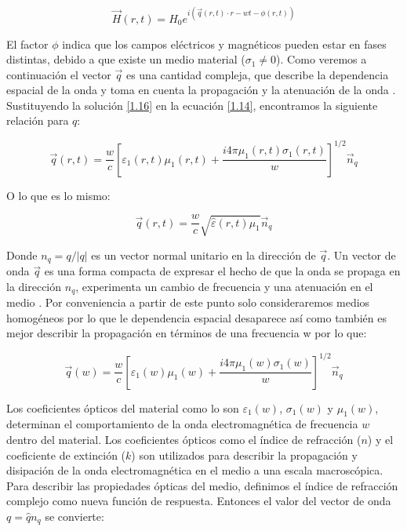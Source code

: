 \documentclass[a4paper,openright,12pt]{book}
\begin{document}
\begin{equation}\label{1.17}
   \vec{H}(r,t)=H_{0}e^{i(\vec{q}(r,t)\cdot r-wt-\phi(r,t))}
\end{equation}

El factor $\phi$ indica que los campos eléctricos y magnéticos pueden estar en fases distintas, debido a que existe un medio material ($\sigma_{1}\not= 0$). Como veremos a continuación el vector $\vec{q}$
es una cantidad compleja, que describe la dependencia espacial de la onda y toma en cuenta la propagación y la atenuación de la onda \cite{electrodynamics}. Sustituyendo la solución \ref{1.16} en la ecuación \ref{1.14}, encontramos la siguiente relación para $q$:

\begin{equation}\label{1.18}
\vec{q}(r,t)=\frac{w}{c}[\varepsilon_{1}(r,t)\mu_{1}(r,t)+ \frac{i4\pi\mu_{1}(r,t)\sigma_{1}(r,t)}{w}]^{1/2}\vec{n}_{q}
\end{equation}

O lo que es lo mismo:

\begin{equation}
\vec{q}(r,t)=\frac{w}{c}\sqrt{\hat{\varepsilon}(r,t)\mu_{1}}\vec{n}_{q}
\end{equation}

Donde $n_{q}=q/|q|$ es un vector normal unitario en la dirección de $\vec{q}$. Un vector de onda $\vec{q}$ es una forma compacta de expresar el hecho de que la onda se propaga en la dirección $n_{q}$, experimenta un cambio de frecuencia  y una atenuación en el medio \cite{electrodynamics}. Por conveniencia a partir de este punto solo consideraremos medios homogéneos por lo que le dependencia espacial desaparece así como también es mejor describir la propagación en términos de una frecuencia w por lo que:

\begin{equation}\label{1.18}
\vec{q}(w)=\frac{w}{c}[\varepsilon_{1}(w)\mu_{1}(w)+ \frac{i4\pi\mu_{1}(w)\sigma_{1}(w)}{w}]^{1/2}\vec{n}_{q}
\end{equation}

Los coeficientes ópticos del material como lo son $\varepsilon_{1}(w)$, $\sigma_{1}(w)$ y $\mu_{1}(w)$, determinan el comportamiento de la onda electromagnética de frecuencia $w$ dentro del material. Los coeficientes ópticos como el índice de refracción ($n$) y el coeficiente de extinción ($k$)  son utilizados para describir la propagación y disipación de la onda electromagnética en el medio a una escala macroscópica. Para describir las propiedades ópticas del medio, definimos el índice de refracción complejo como nueva función de respuesta. Entonces el valor del vector de onda $q=\hat{q}n_{q}$ se convierte:
\end{document}
